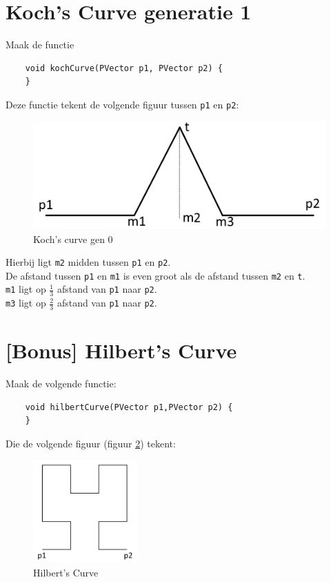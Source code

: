 \documentclass{../qh_assignment}
\begin{document}
\section{Koch's Curve generatie 1}
Maak de functie
\begin{lstlisting}
	void kochCurve(PVector p1, PVector p2) {
	}
\end{lstlisting}
Deze functie tekent de volgende figuur tussen \texttt{p1} en \texttt{p2}:
\begin{figure}[H]
	\centering
	\includegraphics[width=\textwidth]{koch.png}
	\caption{Koch's curve gen 0}
	\label{fig:koch}
\end{figure}
Hierbij ligt \texttt{m2} midden tussen \texttt{p1} en \texttt{p2}.\\
De afstand tussen \texttt{p1} en \texttt{m1} is even groot als de afstand tussen \texttt{m2} en \texttt{t}.\\
\texttt{m1} ligt op $\frac{1}{3}$ afstand van \texttt{p1} naar \texttt{p2}.\\
\texttt{m3} ligt op $\frac{2}{3}$ afstand van \texttt{p1} naar \texttt{p2}.\\

\newpage
\section{[Bonus] Hilbert's Curve}
Maak de volgende functie:
\begin{lstlisting}
	void hilbertCurve(PVector p1,PVector p2) {
	} 
\end{lstlisting}
Die de volgende figuur (figuur \ref{fig:koch}) tekent:
\begin{figure}[H]
	\centering
	\includegraphics[width=4cm]{hilbert.png}
	\caption{Hilbert's Curve}
	\label{fig:koch}
\end{figure}
\end{document}
